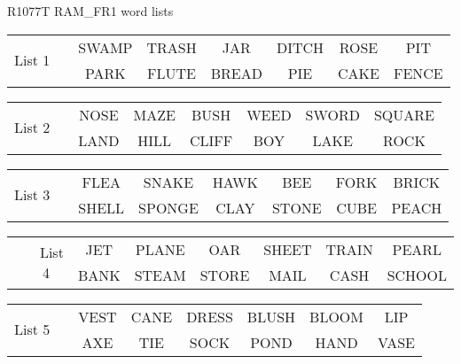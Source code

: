 \documentclass{article}
\begin{document}
\begin{center}
{\large R1077T RAM\_FR1 word lists}
\end{center}

\vspace{.1in}
\hspace{.5in}\begin{tabular}{r||c c c c c c }
\multirow{2}{*}{List 1~~} & SWAMP & TRASH & JAR & DITCH & ROSE & PIT\\
\cline{2-7}			& PARK & FLUTE & BREAD & PIE & CAKE & FENCE\\
\end{tabular}

\vspace{.1in}
\hspace{.5in}\begin{tabular}{r||c c c c c c }
\multirow{2}{*}{List 2~~} & NOSE & MAZE & BUSH & WEED & SWORD & SQUARE\\
\cline{2-7}			& LAND & HILL & CLIFF & BOY & LAKE & ROCK\\
\end{tabular}

\vspace{.1in}
\hspace{.5in}\begin{tabular}{r||c c c c c c }
\multirow{2}{*}{List 3~~} & FLEA & SNAKE & HAWK & BEE & FORK & BRICK\\
\cline{2-7}			& SHELL & SPONGE & CLAY & STONE & CUBE & PEACH\\
\end{tabular}

\vspace{.1in}
\hspace{.5in}\begin{tabular}{r||c c c c c c }
\multirow{2}{*}{List 4~~} & JET & PLANE & OAR & SHEET & TRAIN & PEARL\\
\cline{2-7}			& BANK & STEAM & STORE & MAIL & CASH & SCHOOL\\
\end{tabular}

\vspace{.1in}
\hspace{.5in}\begin{tabular}{r||c c c c c c }
\multirow{2}{*}{List 5~~} & VEST & CANE & DRESS & BLUSH & BLOOM & LIP\\
\cline{2-7}			& AXE & TIE & SOCK & POND & HAND & VASE\\
\end{tabular}
\end{document}
